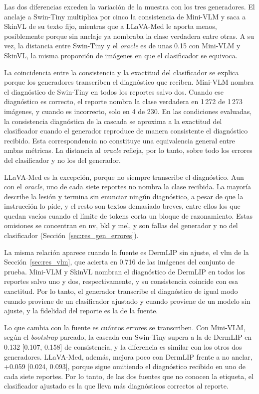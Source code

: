 Las dos diferencias exceden la variación de la muestra con los tres generadores. El anclaje a Swin-Tiny multiplica por
cinco la consistencia de Mini-VLM y saca a SkinVL de su texto fijo, mientras que a LLaVA-Med le aporta menos,
posiblemente porque sin anclaje ya nombraba la clase verdadera entre otras. A su vez, la distancia entre Swin-Tiny y el
\emph{oracle} es de unas 0.15 con Mini-VLM y SkinVL, la misma proporción de imágenes en que el clasificador se
equivoca.

La coincidencia entre la consistencia y la exactitud del clasificador se explica porque los generadores transcriben el diagnóstico que reciben. Mini-VLM nombra el diagnóstico de Swin-Tiny en todos los reportes salvo dos. Cuando ese
diagnóstico es correcto, el reporte nombra la clase verdadera en 1\,272 de 1\,273 imágenes, y cuando es incorrecto,
solo en 4 de 230. En las condiciones evaluadas, la consistencia diagnóstica de la cascada se aproxima a la exactitud del clasificador cuando el generador reproduce de manera consistente el diagnóstico recibido. Esta correspondencia no constituye una equivalencia general entre ambas métricas. La distancia al \emph{oracle} refleja, por lo tanto, sobre todo los errores del clasificador y no los del generador.

LLaVA-Med es la excepción, porque no siempre transcribe el diagnóstico. Aun con el \emph{oracle}, uno de cada siete
reportes no nombra la clase recibida. La mayoría describe la lesión y termina sin enunciar ningún diagnóstico, a pesar
de que la instrucción lo pide, y el resto son textos demasiado breves, entre ellos los que quedan vacíos cuando el
límite de tokens corta un bloque de razonamiento. Estas omisiones se concentran en \gls{nv}, \gls{bkl} y \gls{mel}, y
son fallas del generador y no del clasificador (Sección~\ref{sec:res_gen_errores}).

La misma relación aparece cuando la fuente es DermLIP sin ajuste, el \gls{vlm} de la Sección~\ref{sec:res_vlm}, que
acierta en 0.716 de las imágenes del conjunto de prueba. Mini-VLM y SkinVL nombran el diagnóstico de DermLIP en todos los
reportes salvo uno y dos, respectivamente, y su consistencia coincide con esa exactitud. Por lo tanto, el generador
transcribe el diagnóstico de igual modo cuando proviene de un clasificador ajustado y cuando proviene de un modelo
sin ajuste, y la fidelidad del reporte es la de la fuente.

Lo que cambia con la fuente es cuántos errores se transcriben. Con Mini-VLM, según el \emph{bootstrap} pareado, la cascada con Swin-Tiny supera a la de DermLIP en 0.132 [0.107, 0.158] de consistencia, y la diferencia es similar con los otros dos generadores. LLaVA-Med,
además, mejora poco con DermLIP frente a no anclar, +0.059 [0.024, 0.093], porque sigue omitiendo el diagnóstico recibido en uno de cada
siete reportes. Por lo tanto, de las dos fuentes que no conocen la etiqueta, el clasificador ajustado es la que lleva
más diagnósticos correctos al reporte.

